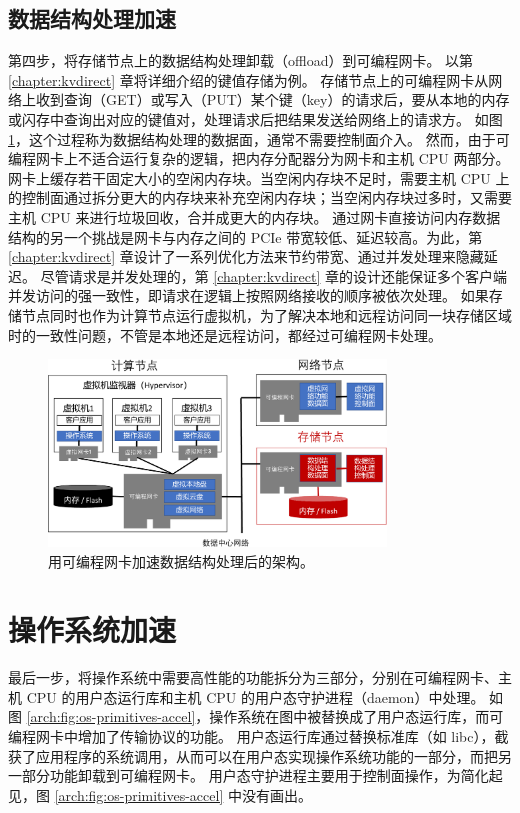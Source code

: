 \subsection{数据结构处理加速}

第四步，将存储节点上的数据结构处理卸载（offload）到可编程网卡。
以第 \ref{chapter:kvdirect} 章将详细介绍的键值存储为例。
存储节点上的可编程网卡从网络上收到查询（GET）或写入（PUT）某个键（key）的请求后，要从本地的内存或闪存中查询出对应的键值对，处理请求后把结果发送给网络上的请求方。
如图 \ref{arch:fig:data-structure-accel}，这个过程称为数据结构处理的数据面，通常不需要控制面介入。
然而，由于可编程网卡上不适合运行复杂的逻辑，把内存分配器分为网卡和主机 CPU 两部分。网卡上缓存若干固定大小的空闲内存块。当空闲内存块不足时，需要主机 CPU 上的控制面通过拆分更大的内存块来补充空闲内存块；当空闲内存块过多时，又需要主机 CPU 来进行垃圾回收，合并成更大的内存块。
通过网卡直接访问内存数据结构的另一个挑战是网卡与内存之间的 PCIe 带宽较低、延迟较高。为此，第 \ref{chapter:kvdirect} 章设计了一系列优化方法来节约带宽、通过并发处理来隐藏延迟。
尽管请求是并发处理的，第 \ref{chapter:kvdirect} 章的设计还能保证多个客户端并发访问的强一致性，即请求在逻辑上按照网络接收的顺序被依次处理。
如果存储节点同时也作为计算节点运行虚拟机，为了解决本地和远程访问同一块存储区域时的一致性问题，不管是本地还是远程访问，都经过可编程网卡处理。

\begin{figure}[htbp]
	\centering
	\includegraphics[width=0.8\textwidth]{figures/data_structure_accel.pdf}
	\caption{用可编程网卡加速数据结构处理后的架构。}
	\label{arch:fig:data-structure-accel}
\end{figure}

\section{操作系统加速}

最后一步，将操作系统中需要高性能的功能拆分为三部分，分别在可编程网卡、主机 CPU 的用户态运行库和主机 CPU 的用户态守护进程（daemon）中处理。
如图 \ref{arch:fig:os-primitives-accel}，操作系统在图中被替换成了用户态运行库，而可编程网卡中增加了传输协议的功能。
用户态运行库通过替换标准库（如 libc），截获了应用程序的系统调用，从而可以在用户态实现操作系统功能的一部分，而把另一部分功能卸载到可编程网卡。
用户态守护进程主要用于控制面操作，为简化起见，图 \ref{arch:fig:os-primitives-accel} 中没有画出。


